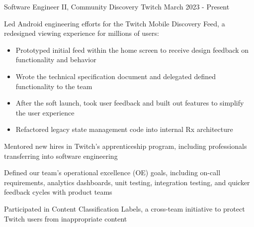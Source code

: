 

\begin{cventries}


  \cventry
    {Software Engineer II, Community Discovery} %
    {Twitch} %
    {} %
    {March 2023 - Present} %
    {
    \begin{cvitems} %
    \item { Led Android engineering efforts for the Twitch Mobile Discovery Feed, a redesigned viewing experience for millions of users: 
        \begin{itemize}
            \item Prototyped initial feed within the home screen to receive design feedback on functionality and behavior
            \item Wrote the technical specification document and delegated defined functionality to the team
            \item After the soft launch, took user feedback and built out features to simplify the user experience
            \item Refactored legacy state management code into internal Rx architecture
        \end{itemize}}
    \item Mentored new hires in Twitch's apprenticeship program, including professionals transferring into software engineering
    \item Defined our team's operational excellence (OE) goals, including on-call requirements, analytics dashboards, unit testing, integration testing, and quicker feedback cycles with product teams
    \item Participated in Content Classification Labels, a cross-team initiative to protect Twitch users from inappropriate content
    \end{cvitems}
    }


\end{cventries}
